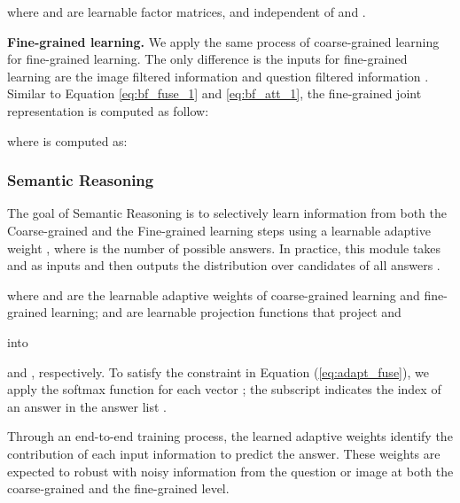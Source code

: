 \documentclass[10pt,twocolumn,letterpaper]{article}
\begin{document}
where  and  are learnable factor matrices, and independent of  and .

\textbf{Fine-grained learning.} We apply the same process of coarse-grained learning for fine-grained learning. The only difference is the inputs for fine-grained learning are the image filtered information  and question filtered information . Similar to Equation \ref{eq:bf_fuse_1} and \ref{eq:bf_att_1}, the fine-grained joint representation is computed as follow:

where  is computed as:









\subsubsection{Semantic Reasoning}
\label{subsec:Sec_Adapt}

The goal of Semantic Reasoning is to selectively learn information from both the Coarse-grained and the Fine-grained learning steps using a learnable adaptive weight , where  is the number of possible answers. In practice, this module takes  and  as inputs and then outputs the distribution  over candidates of all answers .


where  and  are the learnable adaptive weights of coarse-grained learning and fine-grained learning;  and  are learnable projection functions that project 
and 

into  
 
and 
 , respectively. 
To satisfy the constraint in Equation (\ref{eq:adapt_fuse}), we apply the softmax function for each vector ; the subscript  indicates the index of an answer in the answer list .

Through an end-to-end training process, the learned adaptive weights  identify the contribution of each input information to predict the answer. These weights are expected to robust with noisy information from the question or image at both the coarse-grained and the fine-grained level.  
\end{document}
